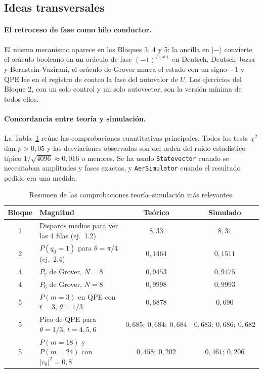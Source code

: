 \subsection{Ideas transversales}

\paragraph{El retroceso de fase como hilo conductor.} El mismo mecanismo aparece en los Bloques 3, 4 y 5: la ancilla en $|{-}\rangle$ convierte el oráculo booleano en un oráculo de fase $(-1)^{f(x)}$ en Deutsch, Deutsch-Jozsa y Bernstein-Vazirani,
el oráculo de Grover marca el estado con un signo $-1$ y QPE lee en el registro de conteo la fase del autovalor de $U$. Los ejercicios del Bloque 2, con un solo control y un solo autovector, son la versión mínima de todos ellos.

\paragraph{Concordancia entre teoría y simulación.} La Tabla~\ref{tab:conclusiones_resumen} reúne las comprobaciones cuantitativas principales. Todos los tests $\chi^2$ dan $p>0{,}05$ y las desviaciones
observadas son del orden del ruido estadístico típico $1/\sqrt{4096}\approx0{,}016$ o menores. Se ha usado \texttt{Statevector} cuando se necesitaban amplitudes y fases exactas, y \texttt{AerSimulator} cuando el resultado pedido era una medida.

\begin{table}[htbp]
    \centering
    {\small\setlength{\tabcolsep}{4pt}
    \begin{tabular}{c|p{}|c|c}
    \hline
    Bloque & Magnitud & Teórico & Simulado \\
    \hline
    1 & Disparos medios para ver las 4 filas (ej.~1.2) & $8{,}33$ & $8{,}31$ \\
    2 & $P(q_0=1)$ para $\theta=\pi/4$ (ej.~2.4) & $0{,}1464$ & $0{,}1511$ \\
    4 & $P_2$ de Grover, $N=8$ & $0{,}9453$ & $0{,}9475$ \\
    4 & $P_6$ de Grover, $N=8$ & $0{,}9998$ & $0{,}9993$ \\
    5 & $P(m=3)$ en QPE con $t=3$, $\theta=1/3$ & $0{,}6878$ & $0{,}690$ \\
    5 & Pico de QPE para $\theta=1/3$, $t=4,5,6$ & $0{,}685;\ 0{,}684;\ 0{,}684$ & $0{,}683;\ 0{,}686;\ 0{,}682$ \\
    5 & $P(m=18)$ y $P(m=24)$ con $|c_0|^2=0{,}8$ & $0{,}458;\ 0{,}202$ & $0{,}461;\ 0{,}206$ \\
    \hline
    \end{tabular}}
    \caption{Resumen de las comprobaciones teoría--simulación más relevantes.}\label{tab:conclusiones_resumen}
\end{table}

